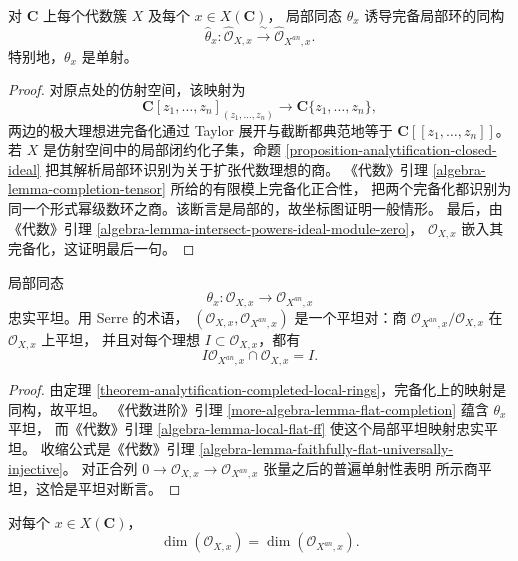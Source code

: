 \begin{theorem}
\label{theorem-analytification-completed-local-rings}
对 $\mathbf C$ 上每个代数簇 $X$ 及每个 $x \in X(\mathbf C)$，
局部同态 $\theta_x$ 诱导完备局部环的同构
$$
\widehat{\theta}_x :
\widehat{\mathcal O}_{X,x} \xrightarrow{\ \sim\ }
\widehat{\mathcal O}_{X^{an},x}.
$$
特别地，$\theta_x$ 是单射。
\end{theorem}

\begin{proof}
对原点处的仿射空间，该映射为
$$
\mathbf C[z_1,\ldots,z_n]_{(z_1,\ldots,z_n)}
\longrightarrow \mathbf C\{z_1,\ldots,z_n\},
$$
两边的极大理想进完备化通过 Taylor 展开与截断都典范地等于
$\mathbf C[[z_1,\ldots,z_n]]$。若 $X$ 是仿射空间中的局部闭约化子集，命题
\ref{proposition-analytification-closed-ideal} 把其解析局部环识别为关于扩张代数理想的商。
《代数》引理 \ref{algebra-lemma-completion-tensor} 所给的有限模上完备化正合性，
把两个完备化都识别为同一个形式幂级数环之商。该断言是局部的，故坐标图证明一般情形。
最后，由《代数》引理 \ref{algebra-lemma-intersect-powers-ideal-module-zero}，
$\mathcal O_{X,x}$ 嵌入其完备化，这证明最后一句。
\end{proof}

\begin{theorem}
\label{theorem-analytification-local-faithfully-flat}
局部同态
$$
\theta_x : \mathcal O_{X,x} \longrightarrow \mathcal O_{X^{an},x}
$$
忠实平坦。用 Serre 的术语，
$(\mathcal O_{X,x},\mathcal O_{X^{an},x})$ 是一个平坦对：商
$\mathcal O_{X^{an},x}/\mathcal O_{X,x}$ 在 $\mathcal O_{X,x}$ 上平坦，
并且对每个理想 $I \subset \mathcal O_{X,x}$，都有
$$
I\mathcal O_{X^{an},x}\cap\mathcal O_{X,x}=I.
$$
\end{theorem}

\begin{proof}
由定理 \ref{theorem-analytification-completed-local-rings}，完备化上的映射是同构，故平坦。
《代数进阶》引理 \ref{more-algebra-lemma-flat-completion} 蕴含 $\theta_x$ 平坦，
而《代数》引理 \ref{algebra-lemma-local-flat-ff} 使这个局部平坦映射忠实平坦。
收缩公式是《代数》引理 \ref{algebra-lemma-faithfully-flat-universally-injective}。
对正合列 $0\to\mathcal O_{X,x}\to\mathcal O_{X^{an},x}$ 张量之后的普遍单射性表明
所示商平坦，这恰是平坦对断言。
\end{proof}

\begin{lemma}
\label{lemma-analytification-local-dimension}
对每个 $x \in X(\mathbf C)$，
$$
\dim(\mathcal O_{X,x})=\dim(\mathcal O_{X^{an},x}).
$$
\end{lemma}

